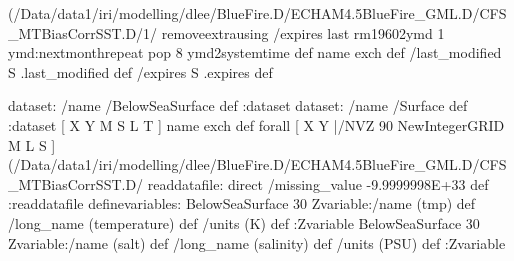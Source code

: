 {(/Data/data1/iri/modelling/dlee/BlueFire.D/ECHAM4.5BlueFire_GML.D/CFS_MTBiasCorrSST.D/1/%
removeextrausing
/expires last rm19602ymd
       1 {ymd:nextmonth}repeat
       pop
      8 ymd2systemtime
     def
name exch def
/last_modified S .last_modified def
/expires S .expires def
\begin{ingrid}
dataset: /name /BelowSeaSurface def :dataset
dataset: /name /Surface def :dataset
[ X Y M S L T ] { name exch def } forall
[ X Y |/NVZ 90  NewIntegerGRID M L S ]
(/Data/data1/iri/modelling/dlee/BlueFire.D/ECHAM4.5BlueFire_GML.D/CFS_MTBiasCorrSST.D/%
readdatafile:
direct
/missing_value  -9.9999998E+33 def
:readdatafile
definevariables:
BelowSeaSurface 30 Zvariable:/name (tmp) def /long_name (temperature) def /units (K) def :Zvariable
BelowSeaSurface 30 Zvariable:/name (salt) def /long_name (salinity) def /units (PSU) def :Zvariable


\end{ingrid}}
